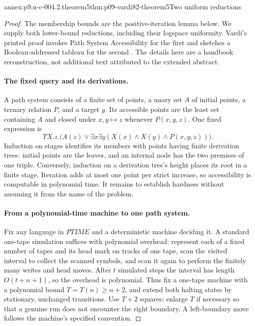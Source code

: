 
\begin{annexitem}{annex:p9.n-c-004.2.theorem5}{thm:p09-vardi82-theorem5}{Two uniform reductions}
\begin{proof}
The membership bounds are the positive-iteration lemma below. We supply
both lower-bound reductions, including their logspace uniformity. Vardi's
printed proof invokes Path System Accessibility for the first and sketches
a Boolean-addressed tableau for the second
\cite[Theorem~5, pp.~141--142]{Vardi1982}. The details here are a handbook
reconstruction, not additional text attributed to the extended abstract.

\paragraph{The fixed query and its derivations.}
A path system consists of a finite set of points, a unary set \(A\) of
initial points, a ternary relation \(P\), and a target \(g\). Its accessible
points are the least set containing \(A\) and closed under
\(x,y\mapsto z\) whenever \(P(x,y,z)\). One fixed expression is
\[
 \Upsilon X.z.\bigl(A(z)\lor
      \exists x\exists y(X(x)\land X(y)\land P(x,y,z))\bigr).
\]
Induction on stages identifies its members with points having finite
derivation trees: initial points are the leaves, and an internal node has
the two premises of one triple. Conversely, induction on a derivation
tree's height places its root in a finite stage. Iteration adds at most
one point per strict increase, so accessibility is computable in polynomial
time. It remains to establish hardness without assuming it from the name
of the problem.

\paragraph{From a polynomial-time machine to one path system.}
Fix any language in \(PTIME\) and a deterministic machine deciding it.
A standard one-tape simulation suffices with polynomial overhead: represent
each of a fixed number of tapes and its head mark on tracks of one tape,
scan the visited interval to collect the scanned symbols, and scan it again
to perform the finitely many writes and head moves. After \(t\) simulated
steps the interval has length \(O(t+n+1)\), so the overhead is polynomial.
Thus fix a one-tape machine with a polynomial bound \(T=T(n)\geq n+2\),
and extend both halting states by stationary, unchanged transitions.
Use \(T+2\) squares; enlarge \(T\) if necessary so that a genuine run
does not encounter the right boundary. A left-boundary move follows the
machine's specified convention.


\end{proof}
\end{annexitem}
